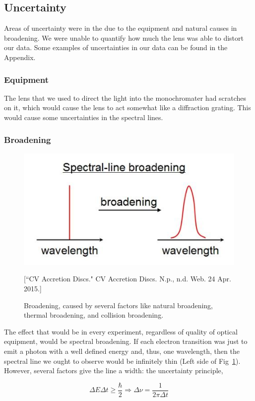 \subsection{Uncertainty}

Areas of uncertainty were in the due to the equipment and natural causes in broadening. We were unable to quantify how much the lens was able to distort our data. Some examples of uncertainties in our data can be found in the Appendix.

\subsubsection{Equipment}

The lens that we used to direct the light into the monochromater had scratches on it, which would cause the lens to act somewhat like a diffraction grating. This would cause some uncertainties in the spectral lines. 

\subsubsection{Broadening}

\begin{figure}[t]
  \includegraphics[width = 5 cm]{Broadening.jpg}
  \begin{center}
  \caption{Broadening, caused by several factors like natural broadening, thermal broadening, and collision broadening.}[\footnotesize{``CV Accretion Discs." CV Accretion Discs. N.p., n.d. Web. 24 Apr. 2015.}]
  \label{Broadening}
  \end{center}
\end{figure}

The effect that would be in every experiment, regardless of quality of optical equipment, would be spectral broadening. If each electron transition was just to emit a photon with a well defined energy and, thus, one wavelength, then the spectral line we ought to observe would be infinitely thin (Left side of Fig~\ref{Broadening}). However, several factors give the line a width: the uncertainty principle,

\begin{equation}
   \Delta{E}\Delta{t} \geq \frac{\hbar}{2} \Rightarrow \Delta \nu = \frac{1}{2 \pi \Delta t}
  \label{Natural Equation}
\end{equation}

